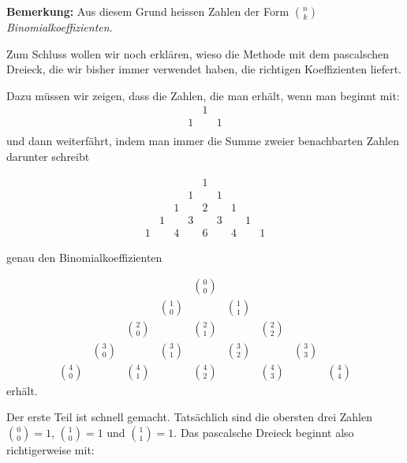 \textbf{Bemerkung:} Aus diesem Grund heissen Zahlen der Form \(\binom{n}{k}\) \textit{Binomialkoeffizienten}.


Zum Schluss wollen wir noch erklären, wieso die Methode mit dem pascalschen Dreieck, die wir bisher immer verwendet haben, die richtigen Koeffizienten liefert.

Dazu müssen wir zeigen, dass die Zahlen, die man erhält, wenn man beginnt mit:
\[
    \begin{array}{ccc}
          & 1 &   \\
        1 &   & 1 \\
    \end{array}
\]
und dann weiterfährt, indem man immer die Summe zweier benachbarten Zahlen darunter schreibt

\[
    \begin{array}{ccccccccc}
          &   &   &   & 1 &   &   &   &   \\
          &   &   & 1 &   & 1 &   &   &   \\
          &   & 1 &   & 2 &   & 1 &   &   \\
          & 1 &   & 3 &   & 3 &   & 1 &   \\
        1 &   & 4 &   & 6 &   & 4 &   & 1
    \end{array}
\]

genau den Binomialkoeffizienten

\[
    \begin{array}{ccccccccc}
                     &              &              &              & \binom{0}{0} &              &              &              &              \\
                     &              &              & \binom{1}{0} &              & \binom{1}{1} &              &              &              \\
                     &              & \binom{2}{0} &              & \binom{2}{1} &              & \binom{2}{2} &              &              \\
                     & \binom{3}{0} &              & \binom{3}{1} &              & \binom{3}{2} &              & \binom{3}{3} &              \\
        \binom{4}{0} &              & \binom{4}{1} &              & \binom{4}{2} &              & \binom{4}{3} &              & \binom{4}{4}
    \end{array}
\]
erhält.

Der erste Teil ist schnell gemacht. Tatsächlich sind die obersten drei Zahlen \(\binom{0}{0} = 1\), \(\binom{1}{0} = 1\) und \(\binom{1}{1} = 1\). Das pascalsche Dreieck beginnt also richtigerweise mit:


